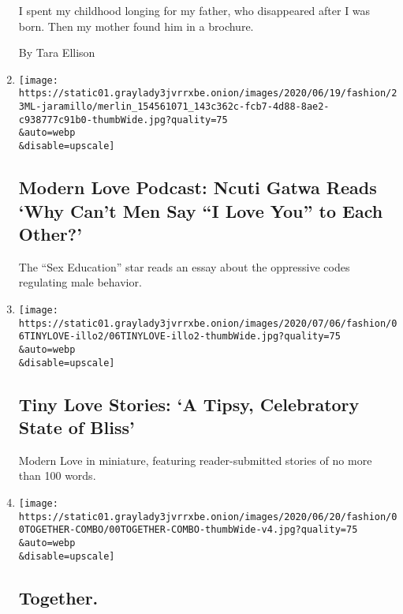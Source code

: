 \begin{enumerate}
  I spent my childhood longing for my father, who disappeared after I
  was born. Then my mother found him in a brochure.

  By Tara Ellison
\item
  \href{/2020/06/17/style/modern-love-podcast-ncuti-gatwa.html}{}

  \texttt{[image: https://static01.graylady3jvrrxbe.onion/images/2020/06/19/fashion/23ML-jaramillo/merlin\_154561071\_143c362c-fcb7-4d88-8ae2-c938777c91b0-thumbWide.jpg?quality=75\\\&auto=webp\\\&disable=upscale]}

  \hypertarget{modern-love-podcast-ncuti-gatwa-reads-why-cant-men-say-i-love-you-to-each-other}{%
  \subsection{Modern Love Podcast: Ncuti Gatwa Reads `Why Can't Men Say
  ``I Love You'' to Each
  Other?'}\label{modern-love-podcast-ncuti-gatwa-reads-why-cant-men-say-i-love-you-to-each-other}}

  The ``Sex Education'' star reads an essay about the oppressive codes
  regulating male behavior.
\item
  \href{/2020/06/16/style/tiny-modern-love-stories-coronavirus-a-tipsy-celebratory-state-of-bliss.html}{}

  \texttt{[image: https://static01.graylady3jvrrxbe.onion/images/2020/07/06/fashion/06TINYLOVE-illo2/06TINYLOVE-illo2-thumbWide.jpg?quality=75\\\&auto=webp\\\&disable=upscale]}

  \hypertarget{tiny-love-stories-a-tipsy-celebratory-state-of-bliss}{%
  \subsection{Tiny Love Stories: `A Tipsy, Celebratory State of
  Bliss'}\label{tiny-love-stories-a-tipsy-celebratory-state-of-bliss}}

  Modern Love in miniature, featuring reader-submitted stories of no
  more than 100 words.
\item
  \href{/2020/06/12/style/modern-love-coronavirus-living-together.html}{}

  \texttt{[image: https://static01.graylady3jvrrxbe.onion/images/2020/06/20/fashion/00TOGETHER-COMBO/00TOGETHER-COMBO-thumbWide-v4.jpg?quality=75\\\&auto=webp\\\&disable=upscale]}

  \hypertarget{together}{%
  \subsection{Together.}\label{together}}


\end{enumerate}

